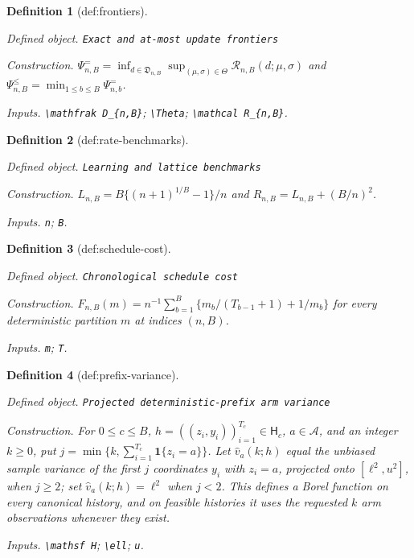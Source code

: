 \documentclass{article}
\newtheorem{definition}{Definition}
\begin{document}
\begin{definition}[def:frontiers]\label{def:frontiers}
\par\smallskip\noindent\emph{Defined object.} \texttt{Exact and at-\allowbreak{}most update frontiers}
\par\smallskip\noindent\emph{Construction.} \(\Psi^{=}_{n,B}=\inf_{d\in\mathfrak D_{n,B}}\sup_{(\mu,\sigma)\in\Theta}\mathcal R_{n,B}(d;\mu,\sigma)\) and \(\Psi^{\le}_{n,B}=\min_{1\le b\le B}\Psi^{=}_{n,b}\).
\par\smallskip\noindent\emph{Inputs.} \texttt{\textbackslash{}\allowbreak{}mathfrak D\_\allowbreak{}\{n,\allowbreak{}B\}\allowbreak{}}; \texttt{\textbackslash{}\allowbreak{}Theta}; \texttt{\textbackslash{}\allowbreak{}mathcal R\_\allowbreak{}\{n,\allowbreak{}B\}\allowbreak{}}.
\end{definition}

\begin{definition}[def:rate-benchmarks]\label{def:rate-benchmarks}
\par\smallskip\noindent\emph{Defined object.} \texttt{Learning and lattice benchmarks}
\par\smallskip\noindent\emph{Construction.} \(L_{n,B}=B\{(n+1)^{1/B}-1\}/n\) and \(R_{n,B}=L_{n,B}+(B/n)^2\).
\par\smallskip\noindent\emph{Inputs.} \texttt{n}; \texttt{B}.
\end{definition}

\begin{definition}[def:schedule-cost]\label{def:schedule-cost}
\par\smallskip\noindent\emph{Defined object.} \texttt{Chronological schedule cost}
\par\smallskip\noindent\emph{Construction.} \(F_{n,B}(m)=n^{-1}\sum_{b=1}^B\{m_b/(T_{b-1}+1)+1/m_b\}\) for every deterministic partition \(m\) at indices \((n,B)\).
\par\smallskip\noindent\emph{Inputs.} \texttt{m}; \texttt{T}.
\end{definition}

\begin{definition}[def:prefix-variance]\label{def:prefix-variance}
\par\smallskip\noindent\emph{Defined object.} \texttt{Projected deterministic-\allowbreak{}prefix arm variance}
\par\smallskip\noindent\emph{Construction.} For \(0\le c\le B\), \(h=((z_i,y_i))_{i=1}^{T_c}\in\mathsf H_c\), \(a\in\mathcal A\), and an integer \(k\ge0\), put \(j=\min\{k,\sum_{i=1}^{T_c}\mathbf 1\{z_i=a\}\}\). Let \(\widehat v_a(k;h)\) equal the unbiased sample variance of the first \(j\) coordinates \(y_i\) with \(z_i=a\), projected onto \([\ell^2,u^2]\), when \(j\ge2\); set \(\widehat v_a(k;h)=\ell^2\) when \(j<2\). This defines a Borel function on every canonical history, and on feasible histories it uses the requested \(k\) arm observations whenever they exist.
\par\smallskip\noindent\emph{Inputs.} \texttt{\textbackslash{}\allowbreak{}mathsf H}; \texttt{\textbackslash{}\allowbreak{}ell}; \texttt{u}.
\end{definition}
\end{document}
